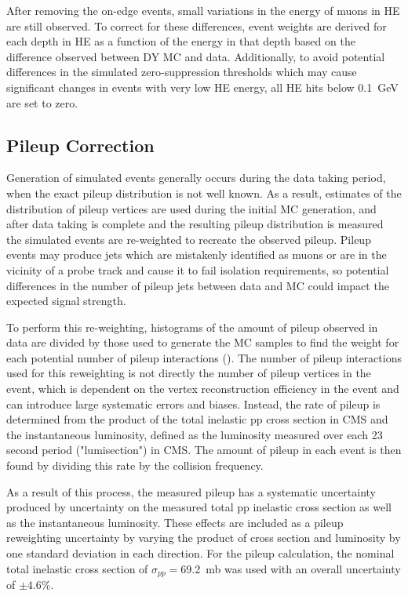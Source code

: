 After removing the on-edge events, small variations in the energy of muons in HE are still observed. 
To correct for these differences, event weights are derived for each depth in HE as a function of the energy in that depth based on the difference observed between DY MC and data.
Additionally, to avoid potential differences in the simulated zero-suppression thresholds which may cause significant changes in events with very low HE energy, all HE hits below \SI{0.1}{\giga\eV} are set to zero.

\subsection{Pileup Correction}
Generation of simulated events generally occurs during the data taking period, when the exact pileup distribution is not well known.
As a result, estimates of the distribution of pileup vertices are used during the initial MC generation, and after data taking is complete and the resulting pileup distribution is measured the simulated events are re-weighted to recreate the observed pileup.
Pileup events may produce jets which are mistakenly identified as muons or are in the vicinity of a probe track and cause it to fail isolation requirements, so potential differences in the number of pileup jets between data and MC could impact the expected signal strength.

To perform this re-weighting, histograms of the amount of pileup observed in data are divided by those used to generate the MC samples to find the weight for each potential number of pileup interactions ().
The number of pileup interactions used for this reweighting is not directly the number of pileup vertices in the event, which is dependent on the vertex reconstruction efficiency in the event and can introduce large systematic errors and biases.
Instead, the rate of pileup is determined from the product of the total inelastic pp cross section in CMS and the instantaneous luminosity, defined as the luminosity measured over each 23 second period ("lumisection") in CMS.
The amount of pileup in each event is then found by dividing this rate by the collision frequency.

As a result of this process, the measured pileup has a systematic uncertainty produced by uncertainty on the measured total pp inelastic cross section as well as the instantaneous luminosity. 
These effects are included as a pileup reweighting uncertainty by varying the product of cross section and luminosity by one standard deviation in each direction.
For the pileup calculation, the nominal total inelastic cross section of $\sigma_{pp}=$\SI{69.2}{\milli\barn} was used with an overall uncertainty of $\pm4.6\%$\cite{pileupCx}.


